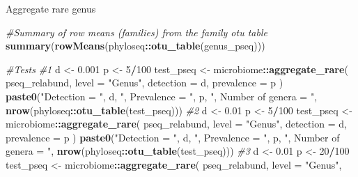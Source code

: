 \documentclass[
]{book}
\newenvironment{Shaded}{\begin{snugshade}}{\end{snugshade}}
\newcommand{\AttributeTok}[1]{\textcolor[rgb]{0.13,0.29,0.53}{#1}}
\newcommand{\CommentTok}[1]{\textcolor[rgb]{0.56,0.35,0.01}{\textit{#1}}}
\newcommand{\DecValTok}[1]{\textcolor[rgb]{0.00,0.00,0.81}{#1}}
\newcommand{\FloatTok}[1]{\textcolor[rgb]{0.00,0.00,0.81}{#1}}
\newcommand{\FunctionTok}[1]{\textcolor[rgb]{0.13,0.29,0.53}{\textbf{#1}}}
\newcommand{\NormalTok}[1]{#1}
\newcommand{\OtherTok}[1]{\textcolor[rgb]{0.56,0.35,0.01}{#1}}
\newcommand{\SpecialCharTok}[1]{\textcolor[rgb]{0.81,0.36,0.00}{\textbf{#1}}}
\newcommand{\StringTok}[1]{\textcolor[rgb]{0.31,0.60,0.02}{#1}}
\begin{document}
Aggregate rare genus

\begin{Shaded}
\begin{Highlighting}[]
\CommentTok{\#Summary of row means (families) from the family otu table}
\FunctionTok{summary}\NormalTok{(}\FunctionTok{rowMeans}\NormalTok{(phyloseq}\SpecialCharTok{::}\FunctionTok{otu\_table}\NormalTok{(genus\_pseq)))}
\end{Highlighting}
\end{Shaded}

\begin{Shaded}
\begin{Highlighting}[]
\CommentTok{\#Tests}
\CommentTok{\#1}
\NormalTok{d }\OtherTok{\textless{}{-}} \FloatTok{0.001}
\NormalTok{p }\OtherTok{\textless{}{-}} \DecValTok{5}\SpecialCharTok{/}\DecValTok{100}
\NormalTok{test\_pseq }\OtherTok{\textless{}{-}}\NormalTok{ microbiome}\SpecialCharTok{::}\FunctionTok{aggregate\_rare}\NormalTok{(}
\NormalTok{  pseq\_relabund, }\AttributeTok{level =} \StringTok{"Genus"}\NormalTok{,}
  \AttributeTok{detection =}\NormalTok{ d, }\AttributeTok{prevalence =}\NormalTok{ p}
\NormalTok{)}
\FunctionTok{paste0}\NormalTok{(}\StringTok{"Detection = "}\NormalTok{, d, }\StringTok{", Prevalence = "}\NormalTok{, p,}
       \StringTok{", Number of genera = "}\NormalTok{, }\FunctionTok{nrow}\NormalTok{(phyloseq}\SpecialCharTok{::}\FunctionTok{otu\_table}\NormalTok{(test\_pseq)))}
\CommentTok{\#2}
\NormalTok{d }\OtherTok{\textless{}{-}} \FloatTok{0.01}
\NormalTok{p }\OtherTok{\textless{}{-}} \DecValTok{5}\SpecialCharTok{/}\DecValTok{100}
\NormalTok{test\_pseq }\OtherTok{\textless{}{-}}\NormalTok{ microbiome}\SpecialCharTok{::}\FunctionTok{aggregate\_rare}\NormalTok{(}
\NormalTok{  pseq\_relabund, }\AttributeTok{level =} \StringTok{"Genus"}\NormalTok{,}
  \AttributeTok{detection =}\NormalTok{ d, }\AttributeTok{prevalence =}\NormalTok{ p}
\NormalTok{)}
\FunctionTok{paste0}\NormalTok{(}\StringTok{"Detection = "}\NormalTok{, d, }\StringTok{", Prevalence = "}\NormalTok{, p,}
       \StringTok{", Number of genera = "}\NormalTok{, }\FunctionTok{nrow}\NormalTok{(phyloseq}\SpecialCharTok{::}\FunctionTok{otu\_table}\NormalTok{(test\_pseq)))}
\CommentTok{\#3}
\NormalTok{d }\OtherTok{\textless{}{-}} \FloatTok{0.01}
\NormalTok{p }\OtherTok{\textless{}{-}} \DecValTok{20}\SpecialCharTok{/}\DecValTok{100}
\NormalTok{test\_pseq }\OtherTok{\textless{}{-}}\NormalTok{ microbiome}\SpecialCharTok{::}\FunctionTok{aggregate\_rare}\NormalTok{(}
\NormalTok{  pseq\_relabund, }\AttributeTok{level =} \StringTok{"Genus"}\NormalTok{,}

\end{Highlighting}
\end{Shaded}
\end{document}
